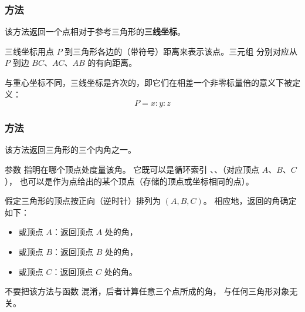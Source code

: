 \subsubsection{方法 }
\label{ssub:triangle_trilinear_coordinates_pt}

该方法返回一个点相对于参考三角形的\textbf{三线坐标}。

\medskip

三线坐标用点 $P$ 到三角形各边的（带符号）距离来表示该点。三元组  分别对应从 $P$ 到边 $BC$、$AC$、$AB$ 的有向距离。

\begin{mybox}
\end{mybox}

\medskip

与重心坐标不同，三线坐标是齐次的，即它们在相差一个非零标量倍的意义下被定义：
\[
P = x : y : z
\]


\subsubsection{方法 }
\label{ssub:method_triangle_get_angle}

该方法返回三角形的三个内角之一。

\medskip

参数  指明在哪个顶点处度量该角。
它既可以是循环索引 、、（对应顶点 $A$、$B$、$C$），
也可以是作为点给出的某个顶点（存储的顶点或坐标相同的点）。

\medskip

假定三角形的顶点按正向（逆时针）排列为 $(A, B, C)$。
相应地，返回的角确定如下：

\begin{itemize}
  \item {} 或顶点 $A$：返回顶点 $A$ 处的角，
  \item {} 或顶点 $B$：返回顶点 $B$ 处的角，
  \item {} 或顶点 $C$：返回顶点 $C$ 处的角。
\end{itemize}

\medskip

不要把该方法与函数
 混淆，后者计算任意三个点所成的角，
与任何三角形对象无关。

\vspace{1em}


